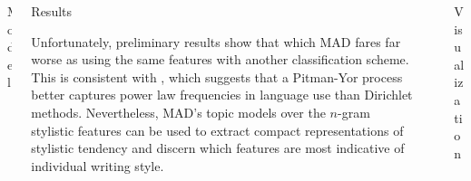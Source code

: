 \documentclass[final]{beamer}
\newlength{\sepwid}
\newlength{\onecolwid}
\newlength{\twocolwid}
\begin{document}
\begin{frame}[t]
\begin{columns}[t]
\begin{column}{\twocolwid}
\begin{columns}[t,totalwidth=\twocolwid]
\begin{column}{\onecolwid}
\begin{block}{Model}
\end{block}


\end{column} %

\begin{column}{\onecolwid} %


\begin{block}{Results}


\small
\indent Unfortunately, preliminary results show that which MAD fares far worse as using the same features with another classification scheme. This is consistent with \cite{...}, which suggests that a Pitman-Yor process better captures power law frequencies in language use than Dirichlet methods. Nevertheless, MAD's topic models over the $n$-gram stylistic features can be used to extract compact representations of stylistic tendency and discern which features are most indicative of individual writing style.

\end{block}


\end{column} %

\end{columns} %

\end{column} %

\begin{column}{\sepwid}\end{column} %

\begin{column}{\onecolwid} %


\begin{block}{Visualization}


\end{block}
\end{column}
\end{columns}
\end{frame}
\end{document}
